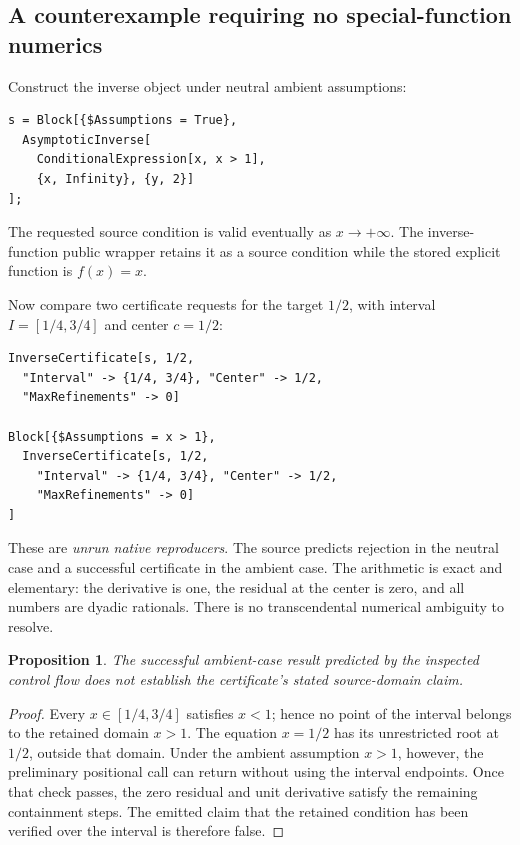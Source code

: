 \documentclass[11pt,a4paper]{article}
\newcommand{\code}[1]{\texttt{\detokenize{#1}}}
\newtheorem{proposition}{Proposition}[section]
\begin{document}
\subsection{A counterexample requiring no special-function numerics}
Construct the inverse object under neutral ambient assumptions:
\begin{lstlisting}
s = Block[{$Assumptions = True},
  AsymptoticInverse[
    ConditionalExpression[x, x > 1],
    {x, Infinity}, {y, 2}]
];
\end{lstlisting}
The requested source condition is valid eventually as \(x\to+\infty\). The inverse-function public wrapper retains it as a source condition while the stored explicit function is \(f(x)=x\).\cite{inverseexpressions}

Now compare two certificate requests for the target \(1/2\), with interval \(I=[1/4,3/4]\) and center \(c=1/2\):
\begin{lstlisting}
InverseCertificate[s, 1/2,
  "Interval" -> {1/4, 3/4}, "Center" -> 1/2,
  "MaxRefinements" -> 0]

Block[{$Assumptions = x > 1},
  InverseCertificate[s, 1/2,
    "Interval" -> {1/4, 3/4}, "Center" -> 1/2,
    "MaxRefinements" -> 0]
]
\end{lstlisting}
These are \emph{unrun native reproducers}. The source predicts rejection in the neutral case and a successful certificate in the ambient case. The arithmetic is exact and elementary: the derivative is one, the residual at the center is zero, and all numbers are dyadic rationals. There is no transcendental numerical ambiguity to resolve.

\begin{proposition}
The successful ambient-case result predicted by the inspected control flow does not establish the certificate's stated source-domain claim.
\end{proposition}
\begin{proof}
Every \(x\in[1/4,3/4]\) satisfies \(x<1\); hence no point of the interval belongs to the retained domain \(x>1\). The equation \(x=1/2\) has its unrestricted root at \(1/2\), outside that domain. Under the ambient assumption \(x>1\), however, the preliminary positional \code{Refine} call can return \code{True} without using the interval endpoints. Once that check passes, the zero residual and unit derivative satisfy the remaining containment steps. The emitted claim that the retained condition has been verified over the interval is therefore false.
\end{proof}
\end{document}
